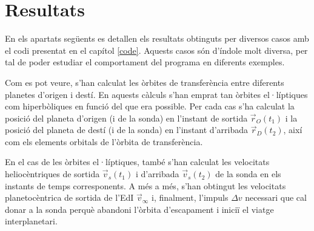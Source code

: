 \chapter{Resultats}
En els apartats següents es detallen els resultats obtinguts per diversos casos amb el codi presentat en el capítol \ref{code}. Aquests casos són d'índole molt diversa, per tal de poder estudiar el comportament del programa en diferents exemples.

Com es pot veure, s'han calculat les òrbites de transferència entre diferents planetes d'origen i destí. En aquests càlculs s'han emprat tan òrbites el·líptiques com hiperbòliques en funció del que era possible. Per cada cas s'ha calculat la posició del planeta d'origen (i de la sonda) en l'instant de sortida $\vec{r}_{O}(t_{1})$ i la posició del planeta de destí (i de la sonda) en l'instant d'arribada $\vec{r}_{D}(t_{2})$, així com els elements orbitals de l'òrbita de transferència.

En el cas de les òrbites el·líptiques, també s'han calculat les velocitats heliocèntriques de sortida $\vec{v}_{s}(t_{1})$ i d'arribada $\vec{v}_{s}(t_{2})$ de la sonda en els instants de temps corresponents. A més a més, s'han obtingut les velocitats planetocèntrica de sortida de l'EdI $\vec{v}_{\infty}$ i, finalment, l'impuls $\Delta v$ necessari que cal donar a la sonda perquè abandoni l'òrbita d'escapament i iniciï el viatge interplanetari.
\pagebreak

